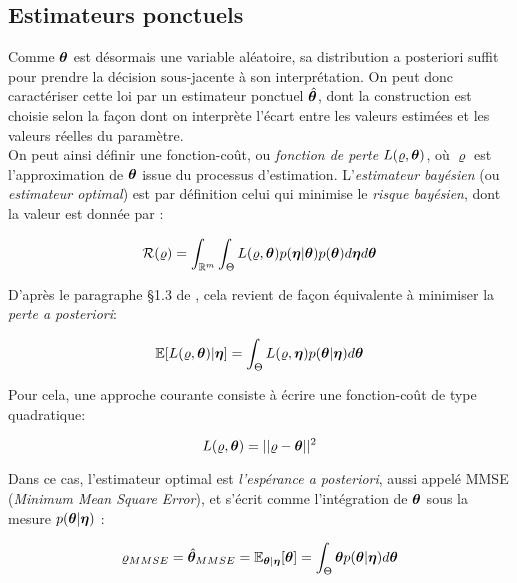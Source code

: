 	\subsection{Estimateurs ponctuels}
Comme ${\bm{\theta}}$ est désormais une variable aléatoire, sa distribution a posteriori suffit pour prendre la décision sous-jacente à son interprétation. On peut donc caractériser cette loi par un estimateur ponctuel $\hat{{\bm{\theta}}}$, dont la construction est choisie selon la façon dont on interprète l'écart entre les valeurs estimées et les valeurs réelles du paramètre.\\

On peut ainsi définir une fonction-coût, ou \textit{fonction de perte} $L(\varrho, {\bm{\theta}})$, où $\varrho$ est l'approximation de ${\bm{\theta}}$ issue du processus d'estimation. L'\textit{estimateur bayésien} (ou \textit{estimateur optimal}) est par définition celui qui minimise le \textit{risque bayésien}, dont la valeur est donnée par : 

\begin{equation}
\mathcal{R}(\varrho) = \int_{\mathbb{R}^m} \int_{\Theta} L(\varrho,{\bm{\theta}})p({\bm{\eta}} | {\bm{\theta}})p({\bm{\theta}}) d{\bm{\eta}} d{\bm{\theta}}
\label{eq_risque_bayesien}
\end{equation}

D'après le paragraphe §1.3 de \cite{Robert2004}, cela revient de façon équivalente à minimiser la \textit{perte a posteriori}:

\begin{equation}
\mathbb{E}[L(\varrho,{\bm{\theta}})|{\bm{\eta}}] = \int_{\Theta} L(\varrho,{\bm{\eta}}){p({\bm{\theta}} | {\bm{\eta}})} d{\bm{\theta}}
\label{eq_perte_a_posteriori}
\end{equation}

Pour cela, une approche courante consiste à écrire une fonction-coût de type quadratique:

\begin{equation}
L(\varrho,{\bm{\theta}}) = || \varrho - {\bm{\theta}} ||^2
\label{eq_fonction_cout_bayesien_quadratique}
\end{equation}
	
Dans ce cas, l'estimateur optimal est \textit{l'espérance a posteriori}, aussi appelé MMSE (\textit{Minimum Mean Square Error}), et s'écrit comme l'intégration de ${\bm{\theta}}$ sous la mesure $p({\bm{\theta}} | {\bm{\eta}})$ : 

\begin{equation}
\varrho_{MMSE} = \hat{{\bm{\theta}}}_{MMSE} = \mathbb{E}_{{\bm{\theta}} | {\bm{\eta}}}[{\bm{\theta}}] = \int_{\Theta}{\bm{\theta}} {p({\bm{\theta}} | {\bm{\eta}})} d{\bm{\theta}}
\label{eq_definition_mmse}
\end{equation}

